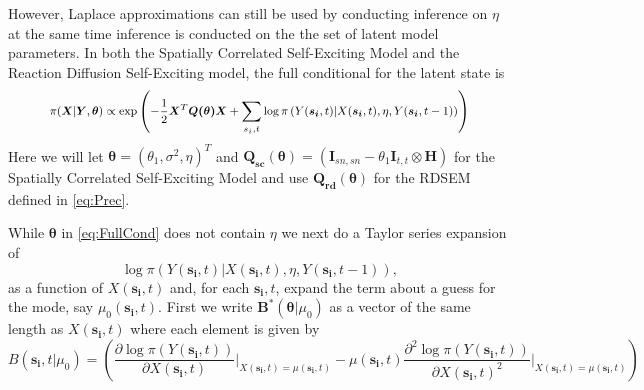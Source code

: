 \documentclass[11pt]{isuthesis}
\begin{document}
However, Laplace approximations can still be used by conducting inference on $\eta$ at the same time inference is conducted on the the set of latent model parameters.  In both the Spatially Correlated Self-Exciting Model and the Reaction Diffusion Self-Exciting model, the full conditional for the latent state is
\begin{equation}
\footnotesize\pi(\boldsymbol{X}|\boldsymbol{Y},\boldsymbol{\theta}) \propto \exp\left(-\frac{1}{2}\boldsymbol{X}^T \boldsymbol{Q(\boldsymbol{\theta})}\boldsymbol{X} + \sum_{s_i,t} \log \pi\left(Y(\boldsymbol{s_i},t)|X(\boldsymbol{s_i},t),\eta,Y(\boldsymbol{s_i},t-1)\right)\right)\label{eq:FullCond}
\end{equation} 
Here we will let $\boldsymbol{\theta}=(\theta_1,\sigma^2,\eta)^T$ and $\boldsymbol{Q_{sc}(\boldsymbol{\theta})}=(\boldsymbol{I}_{sn,sn}-\theta_1\boldsymbol{I}_{t,t} \otimes \boldsymbol{H})$ for the Spatially Correlated Self-Exciting Model and use $\boldsymbol{Q_{rd}(\boldsymbol{\theta})}$ for the RDSEM defined in \eqref{eq:Prec}.

While $\boldsymbol{\theta}$ in \eqref{eq:FullCond} does not contain $\eta$ we next do a Taylor series expansion of \begin{equation*}\log \pi\left(Y(\boldsymbol{s_i},t)|X(\boldsymbol{s_i},t),\eta,Y(\boldsymbol{s_i},t-1)\right),\end{equation*} as a function of $X(\boldsymbol{s_i},t)$ and, for each $\boldsymbol{s_i},t$, expand the term about a guess for the mode, say $\mu_0(\boldsymbol{s_i},t)$.  First we write $\boldsymbol{B^*}(\boldsymbol{\theta}|\mu_0)$ as a vector of the same length as $X(\boldsymbol{s_i},t)$ where each element is given by
\begin{equation}
B(\boldsymbol{s_i},t|\mu_0)=\left(\frac{\partial \log\pi\left(Y(\boldsymbol{s_i},t)\right)}{\partial X(\boldsymbol{s_i},t)}\Bigr|_{X(\boldsymbol{s_i},t)=\mu(\boldsymbol{s_i},t)}-\mu(\boldsymbol{s_i},t) \frac{\partial^2\log\pi\left(Y(\boldsymbol{s_i},t)\right)}{\partial X(\boldsymbol{s_i},t)^2}\Bigr|_{X(\boldsymbol{s_i},t)=\mu(\boldsymbol{s_i},t)}\right)\label{eq:B(si)}
\end{equation}
\end{document}
